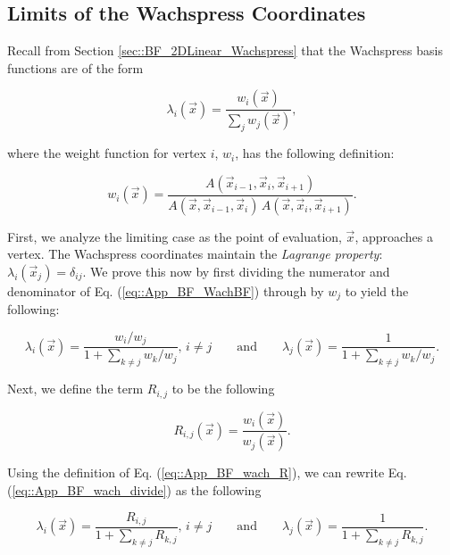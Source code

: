\subsection{Limits of the Wachspress Coordinates}
\label{sec::appendix_BF_Limits_Wachspress}

Recall from Section \ref{sec::BF_2DLinear_Wachspress} that the Wachspress basis functions are of the form

\begin{equation}
\label{eq::App_BF_WachBF}
\lambda_i (\vec{x}) = \frac{w_i  (\vec{x}) }{\sum_j w_j  (\vec{x}) },
\end{equation}

\noindent where the weight function for vertex $i$, $w_i$, has the following definition:

\begin{equation}
\label{eq::App_BF_wach_weights}
w_i (\vec{x})  = \frac{A(\vec{x}_{i-1}, \vec{x}_{i}, \vec{x}_{i+1})}{A(\vec{x}, \vec{x}_{i-1}, \vec{x}_{i}) \, A(\vec{x}, \vec{x}_{i}, \vec{x}_{i+1})} .
\end{equation}

First, we analyze the limiting case as the point of evaluation, $\vec{x}$, approaches a vertex. The Wachspress coordinates maintain the {\em Lagrange property}: $\lambda_i (\vec{x}_j)=\delta_{ij}$. We prove this now by first dividing the numerator and denominator of Eq. (\ref{eq::App_BF_WachBF}) through by $w_j$ to yield the following:

\begin{equation}
\label{eq::App_BF_wach_divide}
\lambda_i (\vec{x}) = \frac{w_i/w_j}{1+\sum_{k\neq j} w_k/w_j}, \, i \neq j \qquad \text{and} \qquad \lambda_j (\vec{x}) = \frac{1}{1+\sum_{k\neq j} w_k/w_j} .
\end{equation}

\noindent Next, we define the term $R_{i,j}$ to be the following

\begin{equation}
\label{eq::App_BF_wach_R}
R_{i,j}(\vec{x}) = \frac{w_i (\vec{x})}{w_j (\vec{x})} .
\end{equation}

\noindent Using the definition of Eq. (\ref{eq::App_BF_wach_R}), we can rewrite Eq. (\ref{eq::App_BF_wach_divide}) as the following 

\begin{equation}
\label{eq::App_BF_wach_divideR}
\lambda_i (\vec{x}) = \frac{R_{i,j}}{1+\sum_{k\neq j} R_{k,j}}, \, i \neq j \qquad \text{and} \qquad \lambda_j (\vec{x}) = \frac{1}{1+\sum_{k\neq j} R_{k,j}} .
\end{equation}

